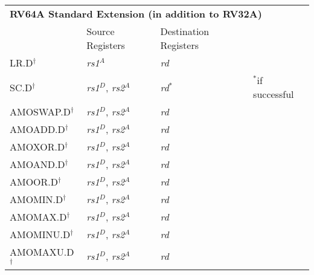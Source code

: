 \begin{tabular}{p{25mm}|p{3cm}|p{6cm}|p{10cm}}
  \multicolumn{4}{l}{\bf RV64A Standard Extension (in addition to RV32A)} \\
  \cline{2-3}
   & Source Registers & Destination Registers \\
  \cline{2-3}
   LR.D$^\dagger$ & {\em rs1}$^A$ & {\em rd} &  \\
   \cline{2-3}
   SC.D$^\dagger$ & {\em rs1}$^D$, {\em rs2}$^A$ & {\em rd}$^*$ & $^*$if successful \\
   \cline{2-3}
   AMOSWAP.D$^\dagger$ & {\em rs1}$^D$, {\em rs2}$^A$ & {\em rd} &  \\
   \cline{2-3}
   AMOADD.D$^\dagger$ & {\em rs1}$^D$, {\em rs2}$^A$ & {\em rd} &  \\
   \cline{2-3}
   AMOXOR.D$^\dagger$ & {\em rs1}$^D$, {\em rs2}$^A$ & {\em rd} &  \\
   \cline{2-3}
   AMOAND.D$^\dagger$ & {\em rs1}$^D$, {\em rs2}$^A$ & {\em rd} &  \\
   \cline{2-3}
   AMOOR.D$^\dagger$ & {\em rs1}$^D$, {\em rs2}$^A$ & {\em rd} &  \\
   \cline{2-3}
   AMOMIN.D$^\dagger$ & {\em rs1}$^D$, {\em rs2}$^A$ & {\em rd} &  \\
   \cline{2-3}
   AMOMAX.D$^\dagger$ & {\em rs1}$^D$, {\em rs2}$^A$ & {\em rd} &  \\
   \cline{2-3}
   AMOMINU.D$^\dagger$ & {\em rs1}$^D$, {\em rs2}$^A$ & {\em rd} &  \\
   \cline{2-3}
   AMOMAXU.D$^\dagger$ & {\em rs1}$^D$, {\em rs2}$^A$ & {\em rd} &  \\
   \cline{2-3}
\end{tabular}

